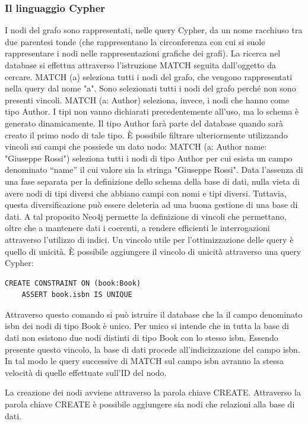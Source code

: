 \documentclass[a4paper, 12pt]{article}
\begin{document}
\subsubsection{Il linguaggio Cypher}
I nodi del grafo sono rappresentati, nelle query Cypher, da un nome racchiuso tra due parentesi tonde (che rappresentano la circonferenza con cui si suole rappresentare i nodi nelle rappresentazioni grafiche dei grafi). La ricerca nel database si effettua attraverso l'istruzione MATCH seguita dall'oggetto da cercare.
MATCH (a) seleziona tutti i nodi del grafo, che vengono rappresentati nella query dal nome "a". Sono selezionati tutti i nodi del grafo perché non sono presenti vincoli.
MATCH (a: Author) seleziona, invece, i nodi che hanno come tipo Author. I tipi non vanno dichiarati precedentemente all'uso, ma lo schema è generato dinamicamente. Il tipo Author farà parte del database quando sarà creato il primo nodo di tale tipo.
\`E possibile filtrare ulteriormente utilizzando vincoli sui campi che possiede un dato nodo:
MATCH (a: Author {name: "Giuseppe Rossi"}) seleziona tutti i nodi di tipo Author per cui esista un campo denominato ``name'' il cui valore sia la stringa "Giuseppe Rossi". Data l'assenza di una fase separata per la definizione dello schema della base di dati, nulla vieta di avere nodi di tipi diversi che abbiano campi con nomi e tipi diversi. Tuttavia, questa diversificazione può essere deleteria ad una buona gestione di una base di dati. A tal proposito Neo4j permette la definizione di vincoli che permettano, oltre che a mantenere dati i coerenti, a rendere efficienti le interrogazioni attraverso l'utilizzo di indici.
Un vincolo utile per l'ottimizzazione delle query è quello di unicità. \`E possibile aggiungere il vincolo di unicità attraverso una query Cypher:
\begin{lstlisting}[keepspaces=true]
  CREATE CONSTRAINT ON (book:Book)
    ASSERT book.isbn IS UNIQUE
\end{lstlisting}
Attraverso questo comando si può istruire il database che la il campo denominato isbn dei nodi di tipo Book è unico. Per unico si intende che in tutta la base di dati non esistono due nodi distinti di tipo Book con lo stesso isbn. Essendo presente questo vincolo, la base di dati procede all'indicizzazione del campo isbn. In tal modo le query successive di MATCH sul campo isbn avranno la stessa velocità di quelle effettuate sull'ID del nodo.
\par
La creazione dei nodi avviene attraverso la parola chiave CREATE. Attraverso la parola chiave CREATE è possibile aggiungere sia nodi che relazioni alla base di dati. \\
\end{document}
